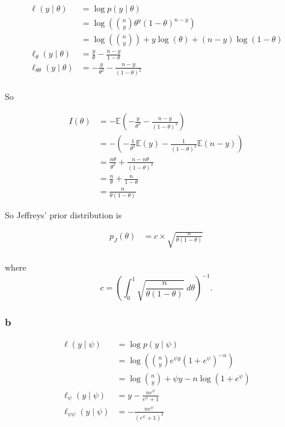 \documentclass[]{article}
\begin{document}
\begin{align}
\ell(y \mid \theta) &= \log p(y \mid \theta) \\
&= \log \left( {n \choose y} \theta^y (1 - \theta)^{n - y} \right) \\
&= \log \left( {n \choose y} \right) + y \log(\theta) + (n - y) \log(1 - \theta) \\
\ell_\theta(y \mid \theta) &= \frac{y}{\theta}- \frac{n - y}{1 - \theta} \\
\ell_{\theta \theta}(y \mid \theta) &= - \frac{y}{\theta^2} - \frac{n - y}{(1 - \theta)^2} \\
\end{align}

So

\begin{align}
I(\theta) &= -\mathbb{E}\left( -\frac{y}{\theta^2} - \frac{n - y}{(1 - \theta)^2} \right) \\
&= - \left( -\frac{1}{\theta^2} \mathbb{E}(y) - \frac{1}{(1 - \theta)^2} \mathbb{E}(n - y) \right) \\
&= \frac{n\theta}{\theta^2} + \frac{n - n\theta}{(1 - \theta)^2} \\
&= \frac{n}{\theta} + \frac{n}{1 - \theta} \\
&= \frac{n}{\theta (1 - \theta)}
\end{align}

So Jeffreys' prior distribution is

\begin{align}
p_J(\theta) &= c \times \sqrt{\frac{n}{\theta (1 - \theta)}} \\
\end{align}

where \[
c = \left( \int_0^1 \sqrt{\frac{n}{\theta(1 - \theta)}} \; d\theta \right)^{-1}.
\]

\hypertarget{b-6}{%
\subsubsection{b}\label{b-6}}

\begin{align}
\ell(y \mid \psi) &= \log p(y \mid \psi) \\
&= \log \left( {n \choose y} e^{\psi y} (1 + e^\psi)^{-n} \right) \\
&= \log {n \choose y} + \psi y - n \log \left(1 + e^\psi \right) \\
\ell_\psi(y \mid \psi) &= y - \frac{n e^\psi}{e^\psi + 1} \\
\ell_{\psi \psi}(y \mid \psi) &= - \frac{n e^\psi}{\left( e^\psi + 1 \right)^2}
\end{align}
\end{document}

